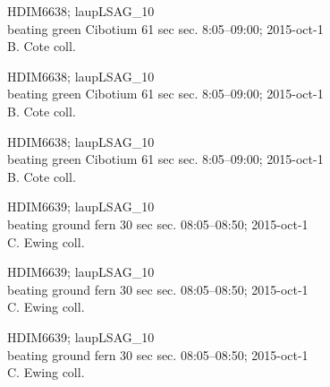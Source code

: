 \documentclass[2pt]{extarticle}
\begin{document}
\noindent
\parbox{0.16\textwidth}{\tiny \raggedright \rule[-0.3\baselineskip]{0pt}{10pt}HDIM6638; laupLSAG\_10\\ beating green Cibotium 61 sec sec. 8:05--09:00; 2015-oct-1\\ B. Cote coll.}
\parbox{0.16\textwidth}{\tiny \raggedright \rule[-0.3\baselineskip]{0pt}{10pt}HDIM6638; laupLSAG\_10\\ beating green Cibotium 61 sec sec. 8:05--09:00; 2015-oct-1\\ B. Cote coll.}
\parbox{0.16\textwidth}{\tiny \raggedright \rule[-0.3\baselineskip]{0pt}{10pt}HDIM6638; laupLSAG\_10\\ beating green Cibotium 61 sec sec. 8:05--09:00; 2015-oct-1\\ B. Cote coll.}
\parbox{0.16\textwidth}{\tiny \raggedright \rule[-0.3\baselineskip]{0pt}{10pt}HDIM6639; laupLSAG\_10\\ beating ground fern 30 sec sec. 08:05--08:50; 2015-oct-1\\ C. Ewing coll.}
\parbox{0.16\textwidth}{\tiny \raggedright \rule[-0.3\baselineskip]{0pt}{10pt}HDIM6639; laupLSAG\_10\\ beating ground fern 30 sec sec. 08:05--08:50; 2015-oct-1\\ C. Ewing coll.}
\parbox{0.16\textwidth}{\tiny \raggedright \rule[-0.3\baselineskip]{0pt}{10pt}HDIM6639; laupLSAG\_10\\ beating ground fern 30 sec sec. 08:05--08:50; 2015-oct-1\\ C. Ewing coll.} \\ 
\vspace{0.001in} 
\end{document}
